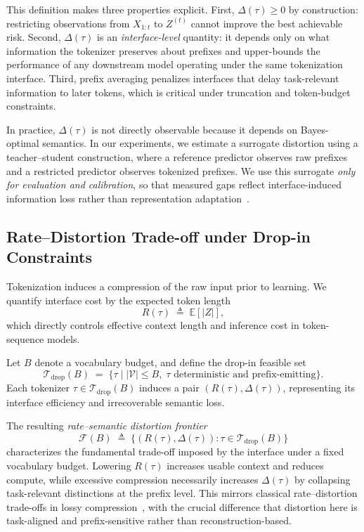 This definition makes three properties explicit.
First, $\Delta(\tau)\ge 0$ by construction: restricting observations from $X_{1:t}$ to $Z^{(t)}$ cannot improve the best achievable risk.
Second, $\Delta(\tau)$ is an \emph{interface-level} quantity: it depends only on what information the tokenizer preserves about prefixes and upper-bounds the performance of any downstream model operating under the same tokenization interface.
Third, prefix averaging penalizes interfaces that delay task-relevant information to later tokens, which is critical under truncation and token-budget constraints.

In practice, $\Delta(\tau)$ is not directly observable because it depends on Bayes-optimal semantics.
In our experiments, we estimate a surrogate distortion using a teacher--student construction, where a reference predictor observes raw prefixes and a restricted predictor observes tokenized prefixes.
We use this surrogate \emph{only for evaluation and calibration}, so that measured gaps reflect interface-induced information loss rather than representation adaptation~\cite{hinton2015distilling}.

\subsection{Rate--Distortion Trade-off under Drop-in Constraints}
\label{sec:rate_distortion}

Tokenization induces a compression of the raw input prior to learning.
We quantify interface cost by the expected token length
\begin{equation}
R(\tau) \;\triangleq\; \mathbb{E}[|Z|],
\label{eq:rate}
\end{equation}
which directly controls effective context length and inference cost in token-sequence models.

Let $B$ denote a vocabulary budget, and define the drop-in feasible set
\begin{equation}
\mathcal{T}_{\mathrm{drop}}(B)
\;=\;
\big\{
\tau \;\big|\;
|\mathcal{V}| \le B,\;
\tau \text{ deterministic and prefix-emitting}
\big\}.
\label{eq:feasible}
\end{equation}
Each tokenizer $\tau \in \mathcal{T}_{\mathrm{drop}}(B)$ induces a pair $(R(\tau), \Delta(\tau))$, representing its interface efficiency and irrecoverable semantic loss.

The resulting \emph{rate--semantic distortion frontier}
\begin{equation}
\mathcal{F}(B)
\;\triangleq\;
\big\{
(R(\tau), \Delta(\tau)) :
\tau \in \mathcal{T}_{\mathrm{drop}}(B)
\big\}
\label{eq:frontier}
\end{equation}
characterizes the fundamental trade-off imposed by the interface under a fixed vocabulary budget.
Lowering $R(\tau)$ increases usable context and reduces compute, while excessive compression necessarily increases $\Delta(\tau)$ by collapsing task-relevant distinctions at the prefix level.
This mirrors classical rate--distortion trade-offs in lossy compression~\cite{shannon1948mathematical,cover1999elements}, with the crucial difference that distortion here is task-aligned and prefix-sensitive rather than reconstruction-based.

